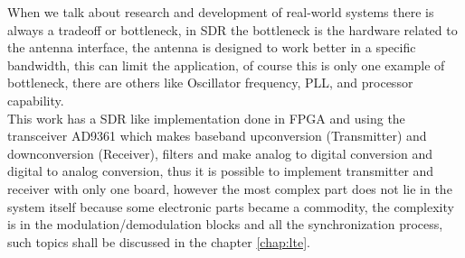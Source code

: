 When we talk about research and development of real-world systems there is
always a tradeoff or bottleneck, in SDR the bottleneck is the hardware related
to the antenna interface, the antenna is designed to work better in a specific
bandwidth, this can limit the application, of course this is only one example of
bottleneck, there are others like Oscillator frequency, PLL, and processor
capability.\\

This work has a SDR like implementation done in FPGA and using the transceiver
AD9361 which makes baseband upconversion (Transmitter) and downconversion
(Receiver), filters and make analog to digital conversion and digital to analog
conversion, thus it is possible to implement transmitter and receiver with only
one board, however the most complex part does not lie in the system itself
because some electronic parts became a commodity, the complexity is in the
modulation/demodulation blocks and all the synchronization process, such topics
shall be discussed in the chapter \ref{chap:lte}.
